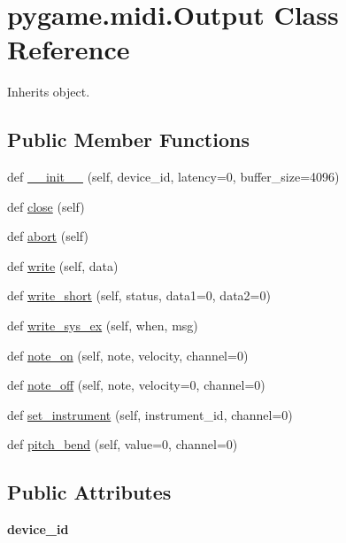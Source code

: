 \hypertarget{classpygame_1_1midi_1_1_output}{}\section{pygame.\+midi.\+Output Class Reference}
\label{classpygame_1_1midi_1_1_output}


Inherits object.

\subsection*{Public Member Functions}
\begin{DoxyCompactItemize}
\item 
def \hyperlink{classpygame_1_1midi_1_1_output_a7e45be4830f504abe9c60194eda9ebe0}{\+\_\+\+\_\+init\+\_\+\+\_\+} (self, device\+\_\+id, latency=0, buffer\+\_\+size=4096)
\item 
def \hyperlink{classpygame_1_1midi_1_1_output_a02d64aa476b0936eaa1de20254c05017}{close} (self)
\item 
def \hyperlink{classpygame_1_1midi_1_1_output_aa8cf09700f93a1f2e63ff5f4910b1f37}{abort} (self)
\item 
def \hyperlink{classpygame_1_1midi_1_1_output_a6e673db0f1fd4e834a0c5e47cdc90e86}{write} (self, data)
\item 
def \hyperlink{classpygame_1_1midi_1_1_output_a55676cf44e2b81ef1b0838cfe9d4acfe}{write\+\_\+short} (self, status, data1=0, data2=0)
\item 
def \hyperlink{classpygame_1_1midi_1_1_output_a5a557c0076a59d906da5cfd99ccfb109}{write\+\_\+sys\+\_\+ex} (self, when, msg)
\item 
def \hyperlink{classpygame_1_1midi_1_1_output_afb6425f4918bfeb29b4abe254c8a2f46}{note\+\_\+on} (self, note, velocity, channel=0)
\item 
def \hyperlink{classpygame_1_1midi_1_1_output_a9a99990dbc2e8354f8a1a3023f318646}{note\+\_\+off} (self, note, velocity=0, channel=0)
\item 
def \hyperlink{classpygame_1_1midi_1_1_output_a0e520ff021805297d99fbdf2857f8bbb}{set\+\_\+instrument} (self, instrument\+\_\+id, channel=0)
\item 
def \hyperlink{classpygame_1_1midi_1_1_output_a5768f014f295925d28da962355a45a55}{pitch\+\_\+bend} (self, value=0, channel=0)
\end{DoxyCompactItemize}
\subsection*{Public Attributes}
\begin{DoxyCompactItemize}
\item 
\mbox{\label{classpygame_1_1midi_1_1_output_a97919b8f15351e840db7818a035a12be}} 
{\bfseries device\+\_\+id}
\end{DoxyCompactItemize}


